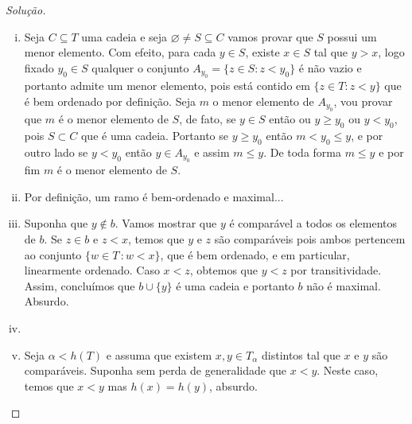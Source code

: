 \documentclass[a4paper]{article}
\theoremstyle{plain}\newtheorem{teo}{Teorema}[section]
\theoremstyle{plain}\newtheorem{prop}[teo]{Proposição}
\theoremstyle{plain}\newtheorem{lem}[teo]{Lema}
\theoremstyle{plain}\newtheorem{cor}[teo]{Corolário}
\theoremstyle{definition}\newtheorem{defi}[teo]{Definição}
\theoremstyle{remark}\newtheorem{rem}[teo]{Observação}
\theoremstyle{definition}\newtheorem{example}[teo]{Exemplo}
\theoremstyle{remark}\newtheorem{step}{\bf Step}
\begin{document}
  \begin{proof}[Solução]\hfill
    \begin{enumerate}[(i)]
      \item  Seja \(C\subseteq T\) uma cadeia e seja
        \(\varnothing\not = S\subseteq C\) vamos provar que \(S\) possui um menor
        elemento. Com efeito, para cada \(y\in S\), existe \(x\in S\) tal que \(y >x\), logo fixado $y_0\in S$ qualquer o conjunto $A_{y_0} =\{z\in S: z<y_{0}\}$ é não vazio e portanto admite um menor elemento, pois está contido em $\{z\in T: z<y\}$ que é bem ordenado por definição. Seja $m$ o menor elemento de $A_{y_0}$, vou provar que $m$ é o menor elemento de $S$, de fato, se $y\in S$ então ou $y\geq y_0$ ou $y<y_0$, pois $S\subset C$ que é uma cadeia.
        Portanto se $y\geq y_0$ então $m<y_0\leq y$, e por outro lado se $y<y_0$ então $y\in A_{y_0}$ e assim $m\leq y$. De toda forma $m\leq y$ e por fim $m$ é o menor elemento de $S$.
      \item Por definição, um ramo é bem-ordenado e maximal...
      \item Suponha que \(y\not\in b\). Vamos mostrar que \(y\) é comparável
        a todos os elementos de \(b\). Se \(z\in b\) e \(z < x\), temos que
        \(y\) e \(z\) são comparáveis pois ambos pertencem ao conjunto \(\{w\in
        T\,\colon w< x \}\), que é bem ordenado, e em particular, linearmente
        ordenado. Caso \(x<z\), obtemos que \(y<z\) por transitividade. Assim,
        concluímos que \(b\cup\{y\}\) é uma cadeia e portanto \(b\) não é
        maximal. Absurdo.
      \item
        \item Seja \(\alpha < h(T)\) e assuma que existem \(x,y\in T_\alpha\)
          distintos tal que \(x\) e \(y\) são comparáveis.
          Suponha sem perda de generalidade que
      \(x<y\). Neste caso, temos que \(x<y\) mas \(h(x)=h(y)\), absurdo.\qedhere
  \end{enumerate}
  \end{proof}
\end{document}

